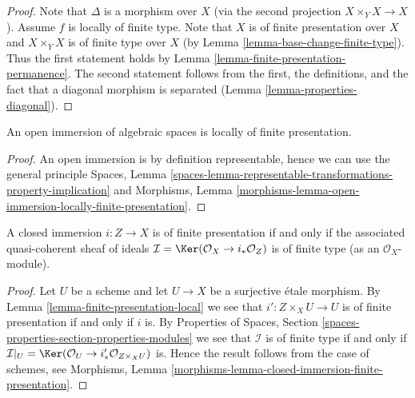 \begin{proof}
Note that $\Delta$ is a morphism over $X$ (via the second
projection $X \times_Y X \to X$). Assume $f$ is locally of finite type.
Note that $X$ is of finite presentation over $X$ and $X \times_Y X$ is
of finite type over $X$ (by Lemma \ref{lemma-base-change-finite-type}).
Thus the first statement holds by
Lemma \ref{lemma-finite-presentation-permanence}.
The second statement follows from the first, the definitions, and
the fact that a diagonal morphism is separated
(Lemma \ref{lemma-properties-diagonal}).
\end{proof}

\begin{lemma}
\label{lemma-open-immersion-locally-finite-presentation}
An open immersion of algebraic spaces is locally of finite presentation.
\end{lemma}

\begin{proof}
An open immersion is by definition representable, hence we can
use the general principle
Spaces,
Lemma \ref{spaces-lemma-representable-transformations-property-implication}
and
Morphisms,
Lemma \ref{morphisms-lemma-open-immersion-locally-finite-presentation}.
\end{proof}

\begin{lemma}
\label{lemma-closed-immersion-finite-presentation}
A closed immersion $i : Z \to X$ is of finite presentation if and only if
the associated quasi-coherent sheaf of ideals
$\mathcal{I} = \Ker(\mathcal{O}_X \to i_*\mathcal{O}_Z)$
is of finite type (as an $\mathcal{O}_X$-module).
\end{lemma}

\begin{proof}
Let $U$ be a scheme and let $U \to X$ be a surjective \'etale morphism.
By Lemma \ref{lemma-finite-presentation-local}
we see that $i' : Z \times_X U \to U$ is of finite presentation if and
only if $i$ is. By Properties of Spaces, Section
\ref{spaces-properties-section-properties-modules}
we see that $\mathcal{I}$ is of finite type if and only if
$\mathcal{I}|_U = \Ker(\mathcal{O}_U \to i'_*\mathcal{O}_{Z \times_X U})$
is. Hence the result follows from the case of schemes, see Morphisms,
Lemma \ref{morphisms-lemma-closed-immersion-finite-presentation}.
\end{proof}








